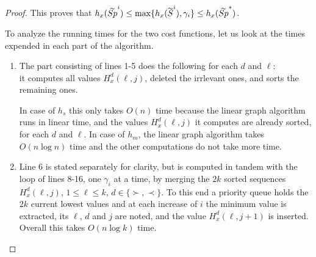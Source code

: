 \begin{proof}
This proves that $h_x(\tildeb{Sp}^i)\leq \max\{h_x(\tildeb{S}^i),\gamma_i \}\leq h_x(\tildeb{Sp}^*)$.

To analyze the running times for the two cost functions, let us look at the times expended
in each part of the algorithm.
\begin{enumerate}
	\item The part consisting of lines 1-5 does the following for each $d$ and $\ell$:\\
	it computes all values $H^{d}_x(\ell,j)$, deleted the irrlevant ones, and sorts the remaining ones. 
	 
	 In case of $h_s$ this only takes $O(n)$ time because the linear graph algorithm 
	 runs in linear time, and the values $H^{d}_x(\ell,j)$ it computes are already sorted, 
	 for each  $d$ and $\ell$. In case of $h_m$, the linear graph algorithm takes $O(n\log n)$
	 time and the other computations do not take more time.
	\item Line 6 is stated separately for clarity, but is computed in tandem with the loop
	of lines 8-16, one $\gamma_i$ at a time, by merging the $2k$ sorted 
	sequences $H^{d}_x(\ell,j)$, $1\leq \ell \leq k$, $d \in \{\succ,\prec\}$. 
    To this end a priority queue holds the  $2k$ current lowest values and at each increase  
    of $i$ the minimum value is extracted, its  $\ell$, $d$ and $j$ are noted, and 
    the value $H^{d}_x(\ell,j+1)$ is inserted. Overall this takes $O(n \log k)$ time.
\end{enumerate}

\end{proof}
